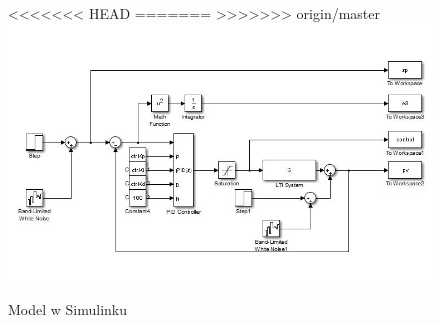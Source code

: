 \begin{figure}[H]
<<<<<<< HEAD
	\centering
=======
>>>>>>> origin/master
	\includegraphics[width=140mm]{ClosedLoopModel.jpg}
	\caption{Model w Simulinku}
	\label{fig:model_simulink}
\end{figure}

